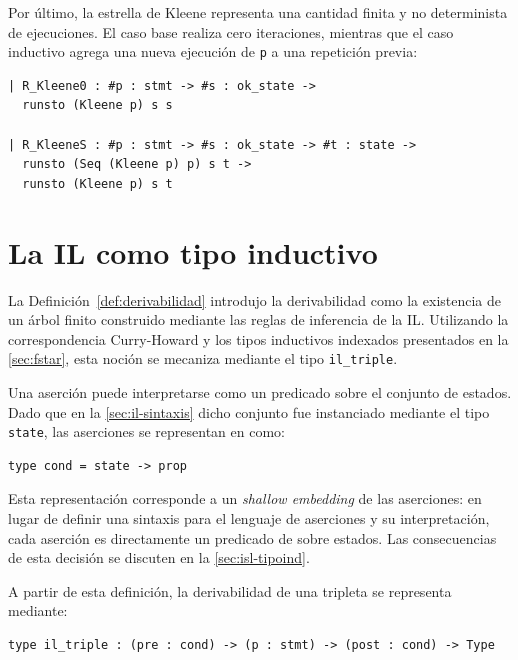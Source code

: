 \documentclass[a4paper,	11pt]{report}
\newif\ifdraft\drafttrue
\newcommand{\comm}[3]{\ifdraft{{\color{#1}[#2: #3]}}\fi}
\newcommand{\guido}[1]{\comm{blue}{Guido}{#1}}
\begin{document}
Por último,
la estrella de Kleene representa una cantidad finita y no determinista de ejecuciones.
El caso base realiza cero iteraciones,
mientras que el caso inductivo agrega una nueva ejecución de \lstinline|p| a una repetición previa:

\begin{lstlisting}
| R_Kleene0 : #p : stmt -> #s : ok_state ->
  runsto (Kleene p) s s

| R_KleeneS : #p : stmt -> #s : ok_state -> #t : state ->
  runsto (Seq (Kleene p) p) s t ->
  runsto (Kleene p) s t
\end{lstlisting}

\section{La IL como tipo inductivo}
\label{sec:il-tipoind}
La Definición~\ref{def:derivabilidad} introdujo la derivabilidad como la existencia de un árbol finito
construido mediante las reglas de inferencia de la IL.
Utilizando la correspondencia Curry-Howard y los tipos inductivos indexados presentados en la \autoref{sec:fstar},
esta noción se mecaniza mediante el tipo \lstinline|il_triple|.

Una aserción puede interpretarse como un predicado sobre el conjunto de estados.
Dado que en la \autoref{sec:il-sintaxis} dicho conjunto fue instanciado mediante el tipo \lstinline|state|,
las aserciones se representan en \fstar{} como:

\begin{lstlisting}
type cond = state -> prop
\end{lstlisting}

Esta representación corresponde a un \emph{shallow embedding} de las aserciones:
en lugar de definir una sintaxis para el lenguaje de aserciones y su interpretación,
cada aserción es directamente un predicado de \fstar{} sobre estados.
Las consecuencias de esta decisión se discuten en la \autoref{sec:isl-tipoind}.

A partir de esta definición, la derivabilidad de una tripleta se representa mediante:

\begin{lstlisting}
type il_triple : (pre : cond) -> (p : stmt) -> (post : cond) -> Type
\end{lstlisting}
\end{document}
